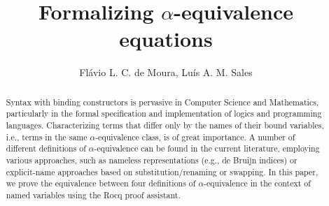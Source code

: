 \documentclass[12pt]{article}
\title{Formalizing \(\alpha\)-equivalence equations}
\author{Flávio L. C. de Moura\inst{1}, Luís A. M. Sales\inst{1}}
\begin{document}
\maketitle

\begin{abstract}
  Syntax with binding constructors is pervasive in Computer Science and Mathematics, particularly in the formal specification and implementation of logics and programming languages. Characterizing terms that differ only by the names of their bound variables, i.e., terms in the same \(\alpha\)-equivalence class, is of great importance. A number of different definitions of \(\alpha\)-equivalence can be found in the current literature, employing various approaches, such as nameless representations (e.g., de Bruijn indices) or explicit-name approaches based on substitution/renaming or swapping. In this paper, we prove the equivalence between four definitions of \(\alpha\)-equivalence in the context of named variables using the Rocq proof assistant.  
\end{abstract}




\end{document}
